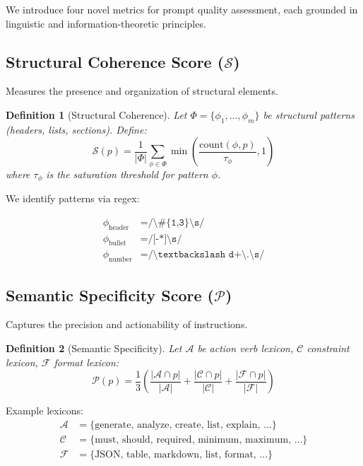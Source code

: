 \documentclass[11pt,a4paper]{article}
\newtheorem{definition}{Definition}
\begin{document}
We introduce four novel metrics for prompt quality assessment, each grounded in linguistic and information-theoretic principles.

\subsection{Structural Coherence Score ($\mathcal{S}$)}

Measures the presence and organization of structural elements.

\begin{definition}[Structural Coherence]
Let $\Phi = \{\phi_1, ..., \phi_m\}$ be structural patterns (headers, lists, sections). Define:
\begin{equation}
\mathcal{S}(p) = \frac{1}{|\Phi|} \sum_{\phi \in \Phi} \min\left(\frac{\text{count}(\phi, p)}{\tau_\phi}, 1\right)
\end{equation}
where $\tau_\phi$ is the saturation threshold for pattern $\phi$.
\end{definition}

We identify patterns via regex:

\begin{align}
\phi_{\text{header}} &= \texttt{/\^{}\#\{1,3\}\textbackslash s/} \\
\phi_{\text{bullet}} &= \texttt{/\^{}[-*]\textbackslash s/} \\
\phi_{\text{number}} &= \texttt{/\^{}\textbackslash d+\textbackslash.\textbackslash s/}
\end{align}

\subsection{Semantic Specificity Score ($\mathcal{P}$)}

Captures the precision and actionability of instructions.

\begin{definition}[Semantic Specificity]
Let $\mathcal{A}$ be action verb lexicon, $\mathcal{C}$ constraint lexicon, $\mathcal{F}$ format lexicon:
\begin{equation}
\mathcal{P}(p) = \frac{1}{3}\left(\frac{|\mathcal{A} \cap p|}{|\mathcal{A}|} + \frac{|\mathcal{C} \cap p|}{|\mathcal{C}|} + \frac{|\mathcal{F} \cap p|}{|\mathcal{F}|}\right)
\end{equation}
\end{definition}

Example lexicons:
\begin{align}
\mathcal{A} &= \{\text{generate, analyze, create, list, explain, ...}\} \\
\mathcal{C} &= \{\text{must, should, required, minimum, maximum, ...}\} \\
\mathcal{F} &= \{\text{JSON, table, markdown, list, format, ...}\}
\end{align}
\end{document}
